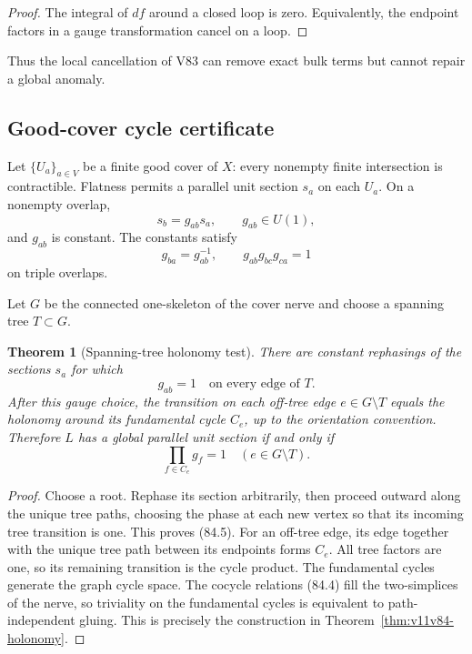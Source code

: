 \documentclass[11pt]{article}
\newtheorem{theorem}{Theorem}[section]
\begin{document}
\begin{proof}
The integral of \(df\) around a closed loop is zero.  Equivalently,
the endpoint factors in a gauge transformation cancel on a loop.
\end{proof}

Thus the local cancellation of V83 can remove exact bulk terms but
cannot repair a global anomaly.

\subsection{Good-cover cycle certificate}

Let \(\{U_a\}_{a\in V}\) be a finite good cover of \(X\): every
nonempty finite intersection is contractible.  Flatness permits a
parallel unit section \(s_a\) on each \(U_a\).  On a nonempty overlap,
\[
                              s_b=g_{ab}s_a,\qquad g_{ab}\in U(1),
                                                                    \tag{84.3}
\]
and \(g_{ab}\) is constant.  The constants satisfy
\[
                    g_{ba}=g_{ab}^{-1},\qquad
                    g_{ab}g_{bc}g_{ca}=1                    \tag{84.4}
\]
on triple overlaps.

Let \(G\) be the connected one-skeleton of the cover nerve and choose
a spanning tree \(T\subset G\).

\begin{theorem}[Spanning-tree holonomy test]
\label{thm:v11v84-tree}
There are constant rephasings of the sections \(s_a\) for which
\[
                              g_{ab}=1\quad\text{on every edge of }T.
                                                                    \tag{84.5}
\]
After this gauge choice, the transition on each off-tree edge
\(e\in G\setminus T\) equals the holonomy around its fundamental
cycle \(C_e\), up to the orientation convention.  Therefore \(L\)
has a global parallel unit section if and only if
\[
                              \prod_{f\in C_e}g_f=1
                  \quad(e\in G\setminus T).                 \tag{84.6}
\]
\end{theorem}

\begin{proof}
Choose a root.  Rephase its section arbitrarily, then proceed outward
along the unique tree paths, choosing the phase at each new vertex so
that its incoming tree transition is one.  This proves (84.5).
For an off-tree edge, its edge together with the unique tree path
between its endpoints forms \(C_e\).  All tree factors are one, so its
remaining transition is the cycle product.  The fundamental cycles
generate the graph cycle space.  The cocycle relations (84.4) fill
the two-simplices of the nerve, so triviality on the fundamental
cycles is equivalent to path-independent gluing.  This is precisely
the construction in Theorem~\ref{thm:v11v84-holonomy}.
\end{proof}
\end{document}
